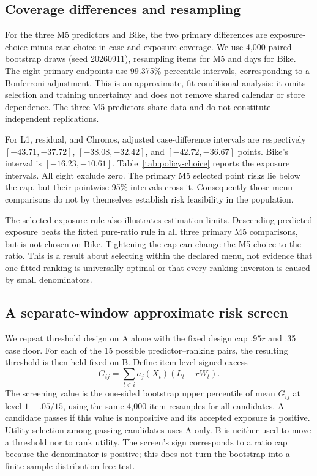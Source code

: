 

\subsection{Coverage differences and resampling}
For the three M5 predictors and Bike, the two primary differences are exposure-choice minus case-choice in case and exposure coverage. We use 4,000 paired bootstrap draws (seed 20260911), resampling items for M5 and days for Bike. The eight primary endpoints use 99.375\% percentile intervals, corresponding to a Bonferroni adjustment. This is an approximate, fit-conditional analysis: it omits selection and training uncertainty and does not remove shared calendar or store dependence. The three M5 predictors share data and do not constitute independent replications.

For L1, residual, and Chronos, adjusted case-difference intervals are respectively $[-43.71,-37.72]$, $[-38.08,-32.42]$, and $[-42.72,-36.67]$ points. Bike's interval is $[-16.23,-10.61]$. Table~\ref{tab:policy-choice} reports the exposure intervals. All eight exclude zero. The primary M5 selected point risks lie below the cap, but their pointwise 95\% intervals cross it. Consequently those menu comparisons do not by themselves establish risk feasibility in the population.

The selected exposure rule also illustrates estimation limits. Descending predicted exposure beats the fitted pure-ratio rule in all three primary M5 comparisons, but is not chosen on Bike. Tightening the cap can change the M5 choice to the ratio. This is a result about selecting within the declared menu, not evidence that one fitted ranking is universally optimal or that every ranking inversion is caused by small denominators.

\subsection{A separate-window approximate risk screen}
\label{sec:risk-screen}
We repeat threshold design on A alone with the fixed design cap $.95r$ and .35 case floor. For each of the 15 possible predictor--ranking pairs, the resulting threshold is then held fixed on B. Define item-level signed excess
\[
 G_{ij}=\sum_{t\in i}a_j(X_t)(L_t-rW_t).
\]
The screening value is the one-sided bootstrap upper percentile of mean $G_{ij}$ at level $1-.05/15$, using the same 4,000 item resamples for all candidates. A candidate passes if this value is nonpositive and its accepted exposure is positive. Utility selection among passing candidates uses A only. B is neither used to move a threshold nor to rank utility. The screen's sign corresponds to a ratio cap because the denominator is positive; this does not turn the bootstrap into a finite-sample distribution-free test.

